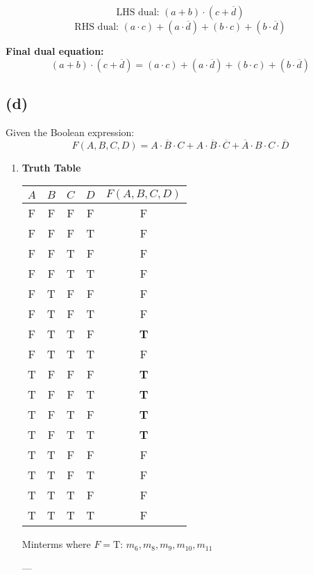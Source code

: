 \documentclass{article}
\begin{document}
\[
\text{LHS dual: } (a + b) \cdot (c + \overline{d})
\]
\[
\text{RHS dual: } (a \cdot c) + (a \cdot \overline{d}) + (b \cdot c) + (b \cdot \overline{d})
\]

\textbf{Final dual equation:}
\[
\boxed{
(a + b) \cdot (c + \overline{d}) = (a \cdot c) + (a \cdot \overline{d}) + (b \cdot c) + (b \cdot \overline{d})
}
\]

\subsection*{(d)}

Given the Boolean expression:
\[
F(A, B, C, D) = A \cdot \overline{B} \cdot C + A \cdot \overline{B} \cdot \overline{C} + \overline{A} \cdot B \cdot C \cdot \overline{D}
\]

\begin{enumerate}[label=\roman*.]

\item \textbf{Truth Table}

\begin{center}
\begin{tabular}{|c|c|c|c||c|}
\hline
$A$ & $B$ & $C$ & $D$ & $F(A,B,C,D)$ \\
\hline
F & F & F & F & F \\
F & F & F & T & F \\
F & F & T & F & F \\
F & F & T & T & F \\
F & T & F & F & F \\
F & T & F & T & F \\
F & T & T & F & \textbf{T} \\
F & T & T & T & F \\
T & F & F & F & \textbf{T} \\
T & F & F & T & \textbf{T} \\
T & F & T & F & \textbf{T} \\
T & F & T & T & \textbf{T} \\
T & T & F & F & F \\
T & T & F & T & F \\
T & T & T & F & F \\
T & T & T & T & F \\
\hline
\end{tabular}
\end{center}

Minterms where \( F = \text{T} \):  
\( m_6, m_8, m_9, m_{10}, m_{11} \)

---


\end{enumerate}
\end{document}
